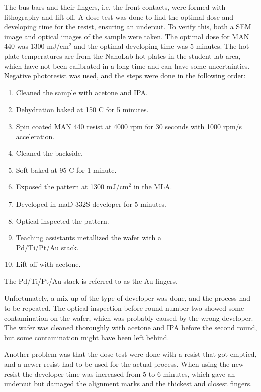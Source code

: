 The bus bars and their fingers, i.e. the front contacts, were formed with lithography and lift-off.
A dose test was done to find the optimal dose and developing time for the resist, ensuring an undercut.
To verify this, both a SEM image and optical images of the sample were taken.
The optimal dose for MAN 440 was 1300 mJ/cm$^2$ and the optimal developing time was 5 minutes.
The hot plate temperatures are from the NanoLab hot plates in the student lab area, which have not been calibrated in a long time and can have some uncertainties. 
Negative photoresist was used, and the steps were done in the following order:
\begin{enumerate}
    \item Cleaned the sample with acetone and IPA.
    \item Dehydration baked at 150 \textdegree C for 5 minutes.
    \item Spin coated MAN 440 resist at 4000 rpm for 30 seconds with 1000 rpm/s acceleration.
    \item Cleaned the backside.
    \item Soft baked at 95 \textdegree C for 1 minute.
    \item Exposed the pattern at 1300 mJ/cm$^2$ in the MLA.
    \item Developed in maD-332S developer for 5 minutes.
    \item Optical inspected the pattern.
    \item Teaching assistants metallized the wafer with a \\Pd/Ti/Pt/Au stack.
    \item Lift-off with acetone.
\end{enumerate}

The Pd/Ti/Pt/Au stack is referred to as the Au fingers. 

Unfortunately, a mix-up of the type of developer was done, and the process had to be repeated. 
The optical inspection before round number two showed some contamination on the wafer, which was probably caused by the wrong developer.
The wafer was cleaned thoroughly with acetone and IPA before the second round, but some contamination might have been left behind.

Another problem was that the dose test were done with a resist that got emptied, and a newer resist had to be used for the actual process.
When using the new resist the developer time was increased from 5 to 6 minutes, which gave an undercut but damaged the alignment marks and the thickest and closest fingers.

